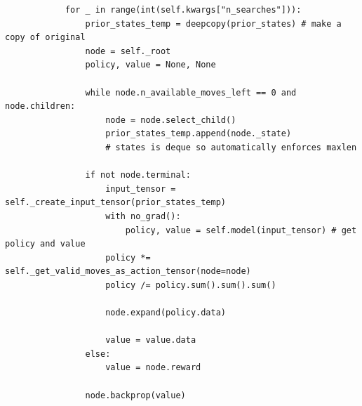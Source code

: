 \documentclass{article}
\begin{document}
\begin{verbatim}
            for _ in range(int(self.kwargs["n_searches"])):
                prior_states_temp = deepcopy(prior_states) # make a copy of original 
                node = self._root
                policy, value = None, None

                while node.n_available_moves_left == 0 and node.children:
                    node = node.select_child()
                    prior_states_temp.append(node._state) 
                    # states is deque so automatically enforces maxlen

                if not node.terminal:
                    input_tensor = self._create_input_tensor(prior_states_temp)
                    with no_grad():
                        policy, value = self.model(input_tensor) # get policy and value
                    policy *= self._get_valid_moves_as_action_tensor(node=node)
                    policy /= policy.sum().sum().sum()

                    node.expand(policy.data)

                    value = value.data
                else:
                    value = node.reward

                node.backprop(value)
    \end{verbatim}
\end{document}
